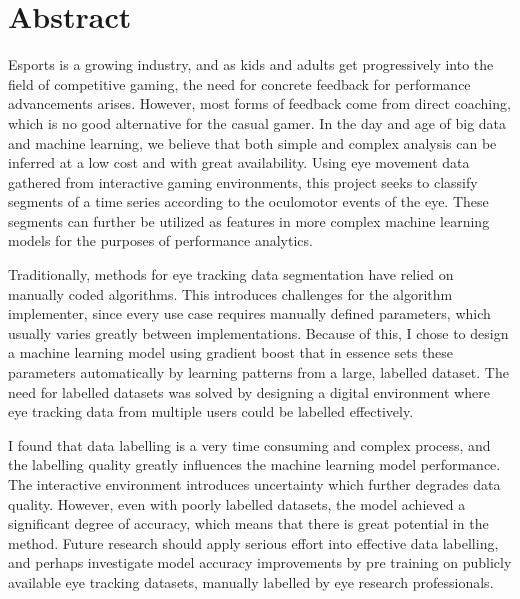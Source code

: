 \chapter*{Abstract} 

Esports is a growing industry, and as kids and adults get progressively into the field of competitive gaming, the need for concrete feedback for performance advancements arises. However, most forms of feedback come from direct coaching, which is no good alternative for the casual gamer. In the day and age of big data and machine learning, we believe that both simple and complex analysis can be inferred at a low cost and with great availability. 
Using eye movement data gathered from interactive gaming environments, this project seeks to classify segments of a time series according to the oculomotor events of the eye. These segments can further be utilized as features in more complex machine learning models for the purposes of performance analytics. 

Traditionally, methods for eye tracking data segmentation have relied on manually coded algorithms. This introduces challenges for the algorithm implementer, since every use case requires manually defined parameters, which usually varies greatly between implementations. Because of this, I chose to design a machine learning model using gradient boost that in essence sets these parameters automatically by learning patterns from a large, labelled dataset. The need for labelled datasets was solved by designing a digital environment where eye tracking data from multiple users could be labelled effectively. 

I found that data labelling is a very time consuming and complex process, and the labelling quality greatly influences the machine learning model performance. The interactive environment introduces uncertainty which further degrades data quality. However, even with poorly labelled datasets, the model achieved a significant degree of accuracy, which means that there is great potential in the method. Future research should apply serious effort into effective data labelling, and perhaps investigate model accuracy improvements by pre training on publicly available eye tracking datasets, manually labelled by eye research professionals.

